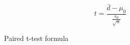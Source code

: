 \begin{figure}[h]
    \caption{Paired t-test formula}\label{figure:t-test_math}
    \centering
    \begin{equation}
        t = \frac{\bar{d} - \mu_0}{\frac{s_d}{\sqrt{n}}}
    \end{equation}
\end{figure}